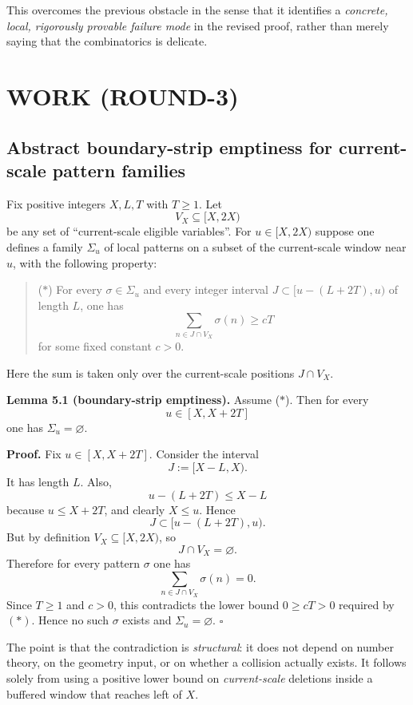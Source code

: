 This overcomes the previous obstacle in the sense that it identifies a \emph{concrete, local, rigorously provable failure mode} in the revised proof, rather than merely saying that the combinatorics is delicate.

\section{WORK (ROUND-3)}

\subsection{Abstract boundary-strip emptiness for current-scale pattern families}

Fix positive integers $X,L,T$ with $T\ge 1$. Let
\[
V_X\subseteq [X,2X)
\]
be any set of ``current-scale eligible variables''. For $u\in[X,2X)$ suppose one defines a family $\Sigma_u$ of local patterns on a subset of the current-scale window near $u$, with the following property:

\begin{quote}
($*$) For every $\sigma\in\Sigma_u$ and every integer interval $J\subset [u-(L+2T),u)$ of length $L$, one has
\[
\sum_{n\in J\cap V_X}\sigma(n)\ge cT
\]
for some fixed constant $c>0$.
\end{quote}

Here the sum is taken only over the current-scale positions $J\cap V_X$.

\textbf{Lemma 5.1 (boundary-strip emptiness).}
Assume ($*$). Then for every
\[
u\in [X,X+2T]
\]
one has $\Sigma_u=\varnothing$.

\textbf{Proof.}
Fix $u\in[X,X+2T]$. Consider the interval
\[
J:=[X-L,X).
\]
It has length $L$. Also,
\[
u-(L+2T)\le X-L
\]
because $u\le X+2T$, and clearly $X\le u$. Hence
\[
J\subset [u-(L+2T),u).
\]
But by definition $V_X\subseteq [X,2X)$, so
\[
J\cap V_X=\varnothing.
\]
Therefore for every pattern $\sigma$ one has
\[
\sum_{n\in J\cap V_X}\sigma(n)=0.
\]
Since $T\ge1$ and $c>0$, this contradicts the lower bound $0\ge cT>0$ required by \((*)\). Hence no such $\sigma$ exists and $\Sigma_u=\varnothing$. \hfill$\square$

\medskip

The point is that the contradiction is \emph{structural}: it does not depend on number theory, on the geometry input, or on whether a collision actually exists. It follows solely from using a positive lower bound on \emph{current-scale} deletions inside a buffered window that reaches left of $X$.

